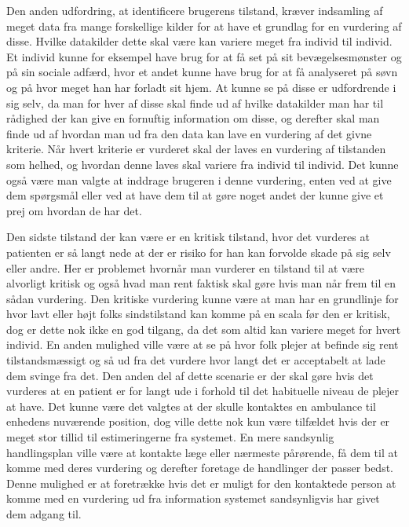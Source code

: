 Den anden udfordring, at identificere brugerens tilstand, kræver indsamling af meget data fra mange forskellige kilder for at have et grundlag for en vurdering af disse.
Hvilke datakilder dette skal være kan variere meget fra individ til individ.
Et individ kunne for eksempel have brug for at få set på sit bevægelsesmønster og på sin sociale adfærd, hvor et andet kunne have brug for at få analyseret på søvn og på hvor meget han har forladt sit hjem.
At kunne se på disse er udfordrende i sig selv, da man for hver af disse skal finde ud af hvilke datakilder man har til rådighed der kan give en fornuftig information om disse, og derefter skal man finde ud af hvordan man ud fra den data kan lave en vurdering af det givne kriterie.
Når hvert kriterie er vurderet skal der laves en vurdering af tilstanden som helhed, og hvordan denne laves skal variere fra individ til individ.
Det kunne også være man valgte at inddrage brugeren i denne vurdering, enten ved at give dem spørgsmål eller ved at have dem til at gøre noget andet der kunne give et prej om hvordan de har det.

Den sidste tilstand der kan være er en kritisk tilstand, hvor det vurderes at patienten er så langt nede at der er risiko for han kan forvolde skade på sig selv eller andre.
Her er problemet hvornår man vurderer en tilstand til at være alvorligt kritisk og også hvad man rent faktisk skal gøre hvis man når frem til en sådan vurdering.
Den kritiske vurdering kunne være at man har en grundlinje for hvor lavt eller højt folks sindstilstand kan komme på en scala før den er kritisk, dog er dette nok ikke en god tilgang, da det som altid kan variere meget for hvert individ.
En anden mulighed ville være at se på hvor folk plejer at befinde sig rent tilstandsmæssigt og så ud fra det vurdere hvor langt det er acceptabelt at lade dem svinge fra det.
Den anden del af dette scenarie er der skal gøre hvis det vurderes at en patient er for langt ude i forhold til det habituelle niveau de plejer at have.
Det kunne være det valgtes at der skulle kontaktes en ambulance til enhedens nuværende position, dog ville dette nok kun være tilfældet hvis der er meget stor tillid til estimeringerne fra systemet.
En mere sandsynlig handlingsplan ville være at kontakte læge eller nærmeste pårørende, få dem til at komme med deres vurdering og derefter foretage de handlinger der passer bedst.
Denne mulighed er at foretrække hvis det er muligt for den kontaktede person at komme med en vurdering ud fra information systemet sandsynligvis har givet dem adgang til.